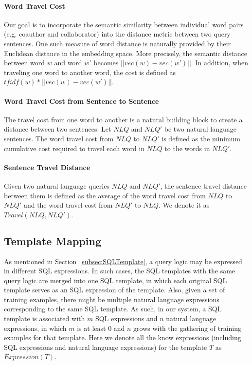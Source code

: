 \documentclass{vldb}
\begin{document}
\paragraph*{Word Travel Cost}
Our goal is to incorporate the semantic similarity between individual word pairs (e.g. coauthor and collaborator) into the distance metric between two query sentences.  One such measure of word distance is naturally provided by their Euclidean distance in the embedding space.  More precisely, the semantic distance between word $w$ and word $w'$ becomes $||vec(w) - vec(w')||$.  In addition, when traveling one word to another word, the cost is defined as $\mathit{tfidf(w) * ||vec(w) - vec(w')||}$.  

\paragraph*{Word Travel Cost from Sentence to Sentence}
The travel cost from one word to another is a natural building block to create a distance between two sentences.  Let $\mathit{NLQ}$ and $\mathit{NLQ'}$ be two natural language sentences.  The word travel cost from $\mathit{NLQ}$ to $\mathit{NLQ'}$ is defined as the minimum cumulative cost required to travel each word in $\mathit{NLQ}$ to the words in $\mathit{NLQ'}$.  

\paragraph*{Sentence Travel Distance}
Given two natural language queries $NLQ$ and $NLQ'$, the sentence travel distance between them is defined as the average of the word travel cost from $\mathit{NLQ}$ to $\mathit{NLQ'}$ and the word travel cost from $\mathit{NLQ'}$ to $\mathit{NLQ}$.  We denote it as $\mathit{Travel(NLQ, NLQ')}$.  

\subsection{Template Mapping}
\label{subsec:mappingRelevance}
As mentioned in Section~\ref{subsec:SQLTemplate}, a query logic may be expressed in different SQL expressions.  In such cases, the SQL templates with the same query logic are merged into one SQL template, in which each original SQL template serves as an SQL expression of the template.  Also, given a set of training examples, there might be multiple natural language expressions corresponding to the same SQL template.  As such, in our system, a SQL template is associated with $m$ SQL expressions and $n$ natural language expressions, in which $m$ is at least 0 and $n$ grows with the gathering of training examples for that template.  Here we denote all the know expressions (including SQL expressions and natural language expressions) for the template $T$ as $\mathit{Expression(T)}$. 
\end{document}
